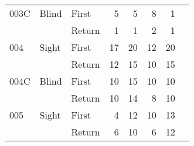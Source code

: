 \begin{table}[!htb]
\begin{tabular}{lllrrrrr}
003C & Blind & First &     5 &                                                     5 &                                                      8 &       1 \\
    &       & Return &     1 &                                                     1 &                                                      2 &       1 \\
004 & Sight & First &    17 &                                                    20 &                                                     12 &      20 \\
    &       & Return &    12 &                                                    15 &                                                     10 &      15 \\
004C & Blind & First &    10 &                                                    15 &                                                     10 &      10 \\
    &       & Return &    10 &                                                    14 &                                                      8 &      10 \\
005 & Sight & First &     4 &                                                    12 &                                                     10 &      13 \\
    &       & Return &     6 &                                                    10 &                                                      6 &      12 \\
\bottomrule
\end{tabular}
\end{table}

